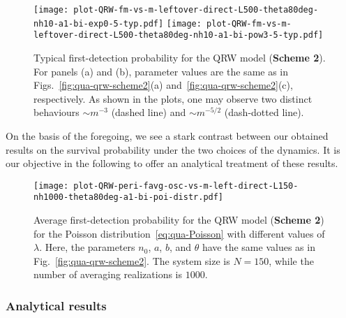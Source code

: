 \documentclass[12pt]{iopart}
\begin{document}
\begin{figure}[!htbp]
\centering
\texttt{[image: plot-QRW-fm-vs-m-leftover-direct-L500-theta80deg-nh10-a1-bi-exp0-5-typ.pdf]} \hskip5pt 
\texttt{[image: plot-QRW-fm-vs-m-leftover-direct-L500-theta80deg-nh10-a1-bi-pow3-5-typ.pdf]}   
\caption{Typical first-detection probability for the QRW model (\textbf{Scheme 2}).  For panels (a) and (b), parameter values are the same as in Figs.~\ref{fig:qua-qrw-scheme2}(a) and~\ref{fig:qua-qrw-scheme2}(c), respectively.  As shown in the plots, one may observe two distinct behaviours $\sim m^{-3}$ (dashed line) and $\sim m^{-5/2}$ (dash-dotted line).}
\label{fig:qrw-f-vs-m-exp-pow-typ}
\end{figure}

On the basis of the foregoing, we see a stark contrast between our
obtained results on the survival probability under the two choices of
the dynamics. It is our objective in the following to offer an
analytical treatment of these results. 

\begin{figure}[!htbp]
\centering
\texttt{[image: plot-QRW-peri-favg-osc-vs-m-left-direct-L150-nh1000-theta80deg-a1-bi-poi-distr.pdf]}
\caption{Average first-detection probability for the QRW model (\textbf{Scheme 2}) for the Poisson distribution~\eqref{eq:qua-Poisson} with different values of $\lambda$.  Here, the parameters $n_0$,  $a$,  $b$,  and $\theta$ have the same values as in Fig.~\ref{fig:qua-qrw-scheme2}.  The system size is $N=150$, while the number of averaging realizations is $1000$. }
\label{fig:qrw-fm-osc}
\end{figure}

\subsubsection{Analytical results}
\label{sec:QRW3b}
\end{document}
